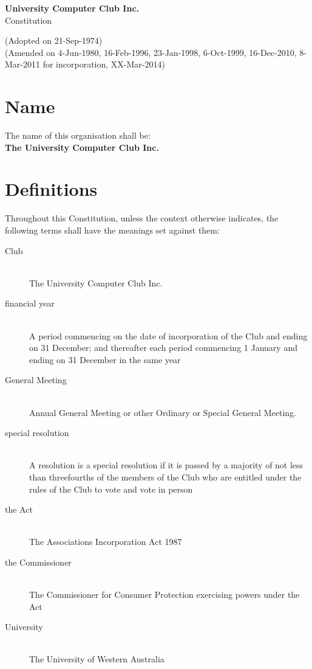 \documentclass[11pt]{article} %
\makeatletter
\renewcommand\tableofcontents{%
    \@starttoc{toc}%
}
\makeatother
\begin{document}
\noindent
\begin{center}
\textbf{\LARGE{University Computer Club Inc.}}\\
\Large{Constitution}
\end{center}

\noindent
\small{(Adopted on 21-Sep-1974)\\
(Amended on 4-Jun-1980, 16-Feb-1996, 23-Jan-1998, 6-Oct-1999, 16-Dec-2010, 8-Mar-2011 for incorporation, XX-Mar-2014)\\}

\begingroup
	\let\cleardoublepage\clearpage
	\def\addvspace#1{}
	\tableofcontents
\endgroup


\section{Name}
\begin{description}
	\item The name of this organisation shall be: \hfill \\
		\large{\textbf{The University Computer Club Inc.}}
\end{description}

\section{Definitions}
Throughout this Constitution, unless the context otherwise indicates, the following terms shall have the meanings set against them:
\begin{description}
	\item[Club] \hfill \\
		The University Computer Club Inc.
	\item[financial year] \hfill \\
		A period commencing on the date of incorporation of the Club and ending on 31 December; and thereafter each period commencing 1 January and ending on 31 December in the same year
	\item[General Meeting] \hfill \\
		Annual General Meeting or other Ordinary or Special General Meeting.
	\item[special resolution] \hfill \\
		A resolution is a special resolution if it is passed by a majority of not less than threefourths of the members of the Club who are entitled under the rules of the Club to vote and vote in person
	\item[the Act] \hfill \\
		The Associations Incorporation Act 1987
	\item[the Commissioner] \hfill \\
		The Commissioner for Consumer Protection exercising powers under the Act
	\item[University] \hfill \\
		The University of Western Australia
\end{description}
\end{document}
